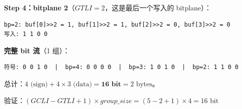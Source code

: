 \begin{examplebox}[title={Packing Worked Example：单组系数的 data packing}]
\textbf{Step 4：bitplane 2}（$\mathit{GTLI} = 2$，这是最后一个写入的 bitplane）：
\begin{lstlisting}[numbers=none]
bp=2: buf[0]>>2 = 1, buf[1]>>2 = 1, buf[2]>>2 = 0, buf[3]>>2 = 0
写入: 1 1 0 0
\end{lstlisting}

\textbf{完整 bit 流}（1 组）：
\begin{lstlisting}[numbers=none]
符号: 0 0 1 0  |  bp=4: 0 0 0 0  |  bp=3: 1 0 1 0  |  bp=2: 1 1 0 0
\end{lstlisting}

总计：$4 \text{ (sign)} + 4 \times 3 \text{ (data)} = \mathbf{16 \text{ bit}} = 2 \text{ bytes}$。

验证：$(\mathit{GCLI} - \mathit{GTLI} + 1) \times \mathit{group\_size} = (5 - 2 + 1) \times 4 = 16 \text{ bit}$ \checkmark

\end{examplebox}
